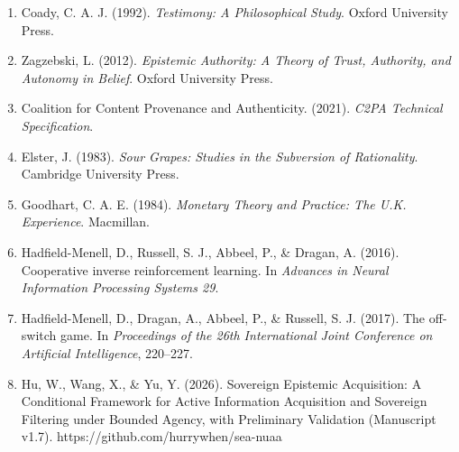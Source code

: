 \documentclass[
  11pt]{article}
\begin{document}
\begin{enumerate}
\item
  Coady, C. A. J. (1992). \emph{Testimony: A Philosophical Study}. Oxford University Press.
\item
  Zagzebski, L. (2012). \emph{Epistemic Authority: A Theory of Trust, Authority, and Autonomy in Belief}. Oxford University Press.
\item
  Coalition for Content Provenance and Authenticity. (2021). \emph{C2PA Technical Specification}.
\item
  Elster, J. (1983). \emph{Sour Grapes: Studies in the Subversion of Rationality}. Cambridge University Press.
\item
  Goodhart, C. A. E. (1984). \emph{Monetary Theory and Practice: The U.K. Experience}. Macmillan.
\item
  Hadfield-Menell, D., Russell, S. J., Abbeel, P., \& Dragan, A. (2016). Cooperative inverse reinforcement learning. In \emph{Advances in Neural Information Processing Systems 29}.
\item
  Hadfield-Menell, D., Dragan, A., Abbeel, P., \& Russell, S. J. (2017). The off-switch game. In \emph{Proceedings of the 26th International Joint Conference on Artificial Intelligence}, 220--227.
\item
  Hu, W., Wang, X., \& Yu, Y. (2026). Sovereign Epistemic Acquisition: A Conditional Framework for Active Information Acquisition and Sovereign Filtering under Bounded Agency, with Preliminary Validation (Manuscript v1.7). https://github.com/hurrywhen/sea-nuaa
\end{enumerate}
\end{document}
